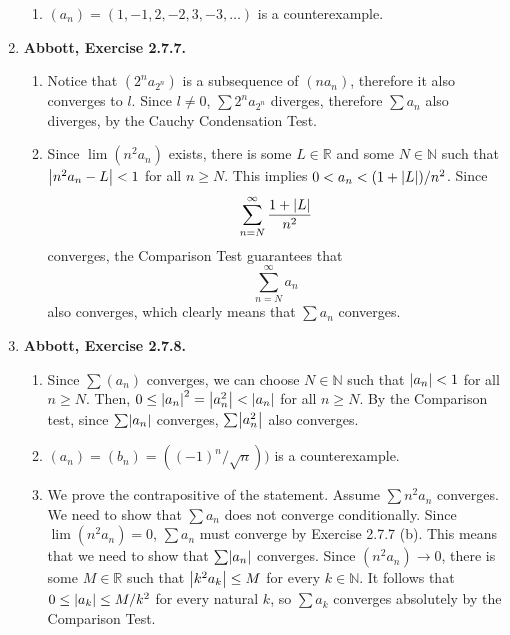 \documentclass{article}
\DeclarePairedDelimiter\abs{\lvert}{\rvert}
\newcommand{\N}{\mathbb{N}}
\newcommand{\R}{\mathbb{R}}
\newcommand{\ra}{\rightarrow}
\newcommand{\exc}[2][Abbott]{\item \textbf{#1, Exercise #2.}}
\begin{document}
\begin{enumerate}
\begin{enumerate}
        \item $(a_n) = (1,-1,2,-2,3,-3, \dots)$ is a counterexample.
    \end{enumerate}
    
    \exc{2.7.7}
    \begin{enumerate}
        \item Notice that $(2^n a_{2^n})$ is a subsequence of $(n a_n)$, therefore it also converges to $l$. Since $l \neq 0$, $\sum 2^n a_{2^n}$ diverges, therefore $\sum a_n$ also diverges, by the Cauchy Condensation Test.
        
        \item Since $\lim(n^2 a_n)$ exists, there is some $L \in \R$ and some $N \in \N$ such that $\abs*{n^2 a_n - L} < 1$ for all $n \geq N$. This implies $0 < a_n < (1+\abs*{L})/n^2$. Since 
        \begin{equation*}
            \sum_{n = N}^\infty \frac{1+\abs*{L}}{n^2}
        \end{equation*} converges, the Comparison Test guarantees that 
        \begin{equation*}
            \sum_{n = N}^\infty a_n 
        \end{equation*} also converges, which clearly means that $\sum a_n$ converges.
    \end{enumerate}
    
    \exc{2.7.8}
    \begin{enumerate}
        \item Since $\sum (a_n)$ converges, we can choose $N \in \N$ such that $\abs*{a_n} < 1$ for all $n \geq N$. Then, $0 \leq \abs*{a_n}^2 = \abs*{a_n^2} < \abs*{a_n}$ for all $n \geq N$. By the Comparison test, since $\sum \abs*{a_n}$ converges, $\sum \abs*{a_n^2}$ also converges.
        
        \item $(a_n) = (b_n) = ((-1)^n/\sqrt{n}))$ is a counterexample.
        
        \item We prove the contrapositive of the statement. Assume $\sum n^2 a_n$ converges. We need to show that $\sum a_n$ does not converge conditionally. Since $\lim (n^2 a_n) = 0$, $\sum a_n$ must converge by Exercise 2.7.7 (b). This means that we need to show that $\sum \abs*{a_n}$ converges. Since $(n^2 a_n) \ra 0$, there is some $M \in \R$ such that $\abs*{k^2 a_k} \leq M$ for every $k \in \N$. It follows that $0 \leq \abs*{a_k} \leq M/k^2$ for every natural $k$, so $\sum a_k$ converges absolutely by the Comparison Test.
    \end{enumerate}
    

\end{enumerate}
\end{document}
